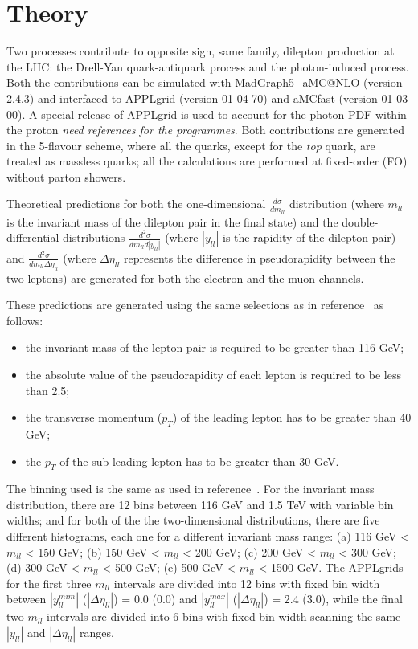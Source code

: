 \section{Theory}
Two processes contribute to opposite sign, same family, dilepton production at the LHC: 
the Drell-Yan quark-antiquark process and the photon-induced process. Both the contributions can be 
simulated with MadGraph5{\_}aMC@NLO (version 2.4.3) and interfaced to APPLgrid (version 01-04-70) and aMCfast (version 01-03-00). A special release of APPLgrid is used to account for the photon PDF within the proton {\it need references for the programmes}.
Both contributions are generated in the 5-flavour scheme, where all the quarks, except for the \textit{top}
 quark, are treated as massless quarks; all the calculations are performed at fixed-order (FO) without 
parton showers. 

Theoretical predictions for both the one-dimensional $\frac{d\sigma}{dm_{ll}}$ distribution 
(where $m_{ll}$ is the invariant mass of the dilepton pair in the final state) and the double-differential 
distributions $\frac{d^{2}\sigma}{dm_{ll}d|y_{ll}|}$ (where $|y_{ll}|$ is the rapidity of the dilepton pair) 
and $\frac{d^{2}\sigma}{dm_{ll}\Delta\eta_{ll}}$ (where $\Delta\eta_{ll}$ represents the difference in 
pseudorapidity between the two leptons) are generated for both the electron and the muon channels.
 
These predictions are generated using the same selections as in reference~\cite{jhep08-2016-009}
as follows:
\begin{itemize}
\item the invariant mass of the lepton pair is required to be greater than 116 GeV;
\item the absolute value of the pseudorapidity of each lepton is required to be less than 2.5;
\item the transverse momentum ($p_{T}$) of the leading lepton has to be greater than 40 GeV;
\item the $p_{T}$ of the sub-leading lepton has to be greater than 30 GeV.
\end{itemize} 
The binning used is the same as used in reference~\cite{jhep08-2016-009}. For the invariant mass 
distribution, there are 12 bins between 116 GeV and 1.5 TeV with variable bin widths; and for both of the 
 the two-dimensional distributions, there are five different histograms, each one for a different invariant
 mass range: (a) 116 GeV < $m_{ll}$ < 150 GeV; (b) 150 GeV < $m_{ll}$ < 200 GeV; (c) 200 GeV < $m_{ll}$ < 300 GeV; (d) 300 GeV < $m_{ll}$ < 500 GeV; (e) 500 GeV < $m_{ll}$ < 1500 GeV.
 The APPLgrids for the first three $m_{ll}$ intervals are divided into 12 bins with fixed bin 
width between $|y_{ll}^{mim}|$ ($|\Delta\eta_{ll}|$)  = 0.0 (0.0) and $|y_{ll}^{max}|$ ($|\Delta\eta_{ll}|$) = 2.4 (3.0), while the final two $m_{ll}$ intervals are divided into 6 bins with fixed bin width scanning the same $|y_{ll}|$ and $|\Delta\eta_{ll}|$ ranges.

